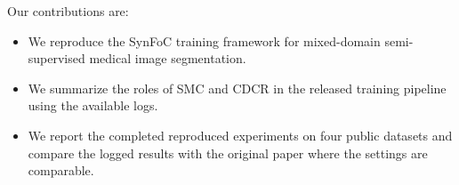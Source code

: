 Our contributions are:
\begin{itemize}
    \item We reproduce the SynFoC training framework for mixed-domain semi-supervised medical image segmentation.
    \item We summarize the roles of SMC and CDCR in the released training pipeline using the available logs.
    \item We report the completed reproduced experiments on four public datasets and compare the logged results with the original paper where the settings are comparable.
\end{itemize}
